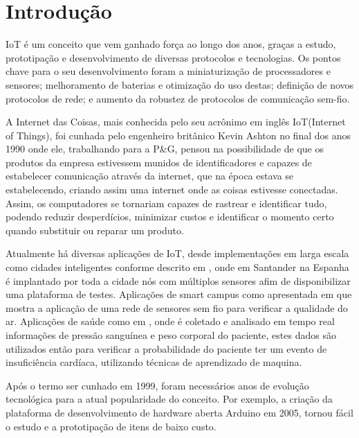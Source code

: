 \chapter[Introdução]{Introdução}
\label{cap:intro}

IoT é um conceito que vem ganhado força ao longo dos anos, graças a estudo, prototipação e desenvolvimento de diversas protocolos e tecnologias. Os pontos chave para o seu desenvolvimento foram a miniaturização de processadores e sensores; melhoramento de baterias e otimização do uso destas; definição de novos protocolos de rede; e aumento da robustez de protocolos de comunicação sem-fio.

A Internet das Coisas, mais conhecida pelo seu acrônimo em inglês IoT(Internet of Things), foi cunhada pelo engenheiro britânico Kevin Ashton no final dos anos 1990 onde ele, trabalhando para a P\&G, pensou na possibilidade de que os produtos da empresa estivessem munidos de identificadores e capazes de estabelecer comunicação através da internet, que na época estava se estabelecendo, criando assim uma internet onde as coisas estivesse conectadas\cite{KA_IOT}. Assim, os computadores se tornariam capazes de rastrear e identificar tudo, podendo reduzir desperdícios, minimizar custos e identificar o momento certo quando substituir ou reparar um produto\cite{lopezIOT}.

Atualmente há diversas aplicações de IoT, desde implementações em larga escala como cidades inteligentes conforme descrito em \cite{sotres2017practical}, onde em Santander na Espanha é implantado por toda a cidade nós com múltiplos sensores afim de disponibilizar uma plataforma de testes. Aplicações de smart campus como apresentada em \cite{wang2017performance} que mostra a aplicação de uma rede de sensores sem fio para verificar a qualidade do ar. Aplicações de saúde como em \cite{zhang2015remote}, onde é coletado e analisado em tempo real informações de pressão sanguínea e peso corporal do paciente, estes dados são utilizados então para verificar a probabilidade do paciente ter um evento de insuficiência cardíaca, utilizando técnicas de aprendizado de maquina.

Após o termo ser cunhado em 1999, foram necessários anos de evolução tecnológica para a atual popularidade do conceito. Por exemplo, a criação da plataforma de desenvolvimento de hardware aberta Arduino em 2005\cite{OC_ARDUINO}, tornou fácil o estudo e a prototipação de itens de baixo custo. 

